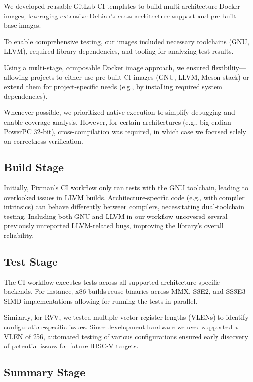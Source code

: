\documentclass[
	a4paper, %
	10pt, %
	unnumberedsections, %
	twoside, %
]{LTJournalArticle}
\begin{document}
We developed reusable GitLab CI templates to build multi-architecture Docker images, leveraging extensive Debian's cross-architecture support and pre-built base images.

To enable comprehensive testing, our images included necessary toolchains (GNU, LLVM), required library dependencies, and tooling for analyzing test results.

Using a multi-stage, composable Docker image approach, we ensured flexibility—allowing projects to either use pre-built CI images (GNU, LLVM, Meson stack) or extend them for project-specific needs (e.g., by installing required system dependencies).

Whenever possible, we prioritized native execution to simplify debugging and enable coverage analysis. However, for certain architectures (e.g., big-endian PowerPC 32-bit), cross-compilation was required, in which case we focused solely on correctness verification.

\subsection{Build Stage}

Initially, Pixman's CI workflow only ran tests with the GNU toolchain, leading to overlooked issues in LLVM builds. Architecture-specific code (e.g., with compiler intrinsics) can behave differently between compilers, necessitating dual-toolchain testing. Including both GNU and LLVM in our workflow uncovered several previously unreported LLVM-related bugs, improving the library's overall reliability.

\subsection{Test Stage}

The CI workflow executes tests across all supported architecture-specific backends. For instance, x86 builds reuse binaries across MMX, SSE2, and SSSE3 SIMD implementations allowing for running the tests in parallel.

Similarly, for RVV, we tested multiple vector register lengths (VLENs) to identify configuration-specific issues. Since development hardware we used supported a VLEN of 256, automated testing of various configurations ensured early discovery of potential issues for future RISC-V targets.

\subsection{Summary Stage}
\end{document}
